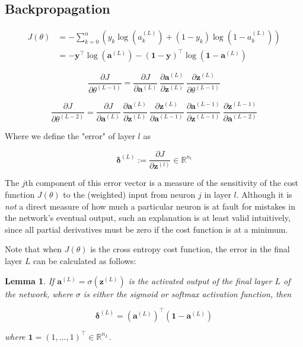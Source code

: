 \documentclass{article}
\newtheorem{lemma}{Lemma}
\begin{document}
    \subsection{Backpropagation}
        
        
        $$ \begin{aligned}
        J(\theta) &= - \sum_{k=0}^{n} \left( y_k \log(a^{(L)}_k) + (1 - y_k) \log(1 - a^{(L)}_k) \right) \\
            &= -\mathbf{y}^\top \log(\mathbf{a}^{(L)}) - (\mathbf{1}-\mathbf{y})^\top \log(\mathbf{1} - \mathbf{a}^{(L)})
        \end{aligned} $$
        
        
        
        $$
        \frac{\partial J}{\partial \theta^{(L-1)}} =
            \frac{\partial J}{\partial \mathbf{a}^{(L)}} \
            \frac{\partial \mathbf{a}^{(L)}}{\partial \mathbf{z}^{(L)}} \
            \frac{\partial \mathbf{z}^{(L)}}{\partial \theta^{(L-1)}}
        $$



        $$
        \frac{\partial J}{\partial \theta^{(L-2)}} =
            \frac{\partial J}{\partial \mathbf{a}^{(L)}} \
            \frac{\partial \mathbf{a}^{(L)}}{\partial \mathbf{z}^{(L)}} \
            \frac{\partial \mathbf{z}^{(L)}}{\partial \mathbf{a}^{(L-1)}} \
            \frac{\partial \mathbf{a}^{(L-1)}}{\partial \mathbf{z}^{(L-1)}} \
            \frac{\partial \mathbf{z}^{(L-1)}}{\partial \mathbf{a}^{(L-2)}}
        $$



    Where we define the "error" of layer $l$ as
    
        $$
        \mathbf{\delta}^{(L)} :=  \frac{\partial J}{\partial \mathbf{z}^{(l)}} \in \mathbb{R}^{n_l}
        $$
        
        The $j$th component of this error vector is a measure of the sensitivity of the cost function $J(\theta)$ to the (weighted) input from neuron $j$ in layer $l$. Although it is \textit{not} a direct measure of how much a particular neuron is at fault for mistakes in the network's eventual output, such an explanation is at least valid intuitively, since all partial derivatives must be zero if the cost function is at a minimum.
        
        Note that when $J(\theta)$ is the cross entropy cost function, the error in the final layer $L$ can be calculated as follows:
        
        \begin{lemma}
            If $\mathbf{a}^{(L)} = \sigma(\mathbf{z}^{(L)})$ is the activated output of the final layer $L$ of the network, where $\sigma$ is either the sigmoid or softmax activation function, then
            
            $$
            \mathbf{\delta}^{(L)} = \left( \mathbf{a}^{(L)} \right)^\top \left( \mathbf{1} - \mathbf{a}^{(L)} \right)$$
            
            where $\mathbf{1} = (1, ..., 1)^\top \in \mathbb{R}^{n_{L}}$.
        \end{lemma}
        
\end{document}

